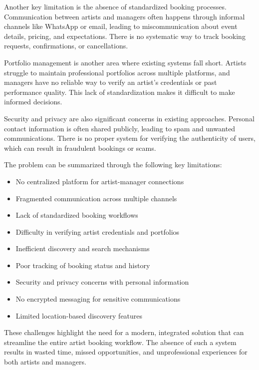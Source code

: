 \documentclass[12pt,a4paper]{report}
\begin{document}
Another key limitation is the absence of standardized booking processes. Communication between artists and managers often happens through informal channels like WhatsApp or email, leading to miscommunication about event details, pricing, and expectations. There is no systematic way to track booking requests, confirmations, or cancellations.

Portfolio management is another area where existing systems fall short. Artists struggle to maintain professional portfolios across multiple platforms, and managers have no reliable way to verify an artist's credentials or past performance quality. This lack of standardization makes it difficult to make informed decisions.

Security and privacy are also significant concerns in existing approaches. Personal contact information is often shared publicly, leading to spam and unwanted communications. There is no proper system for verifying the authenticity of users, which can result in fraudulent bookings or scams.

The problem can be summarized through the following key limitations:

\begin{itemize}
\item No centralized platform for artist-manager connections

\item Fragmented communication across multiple channels

\item Lack of standardized booking workflows

\item Difficulty in verifying artist credentials and portfolios

\item Inefficient discovery and search mechanisms

\item Poor tracking of booking status and history

\item Security and privacy concerns with personal information

\item No encrypted messaging for sensitive communications

\item Limited location-based discovery features
\end{itemize}

These challenges highlight the need for a modern, integrated solution that can streamline the entire artist booking workflow. The absence of such a system results in wasted time, missed opportunities, and unprofessional experiences for both artists and managers.
\end{document}
